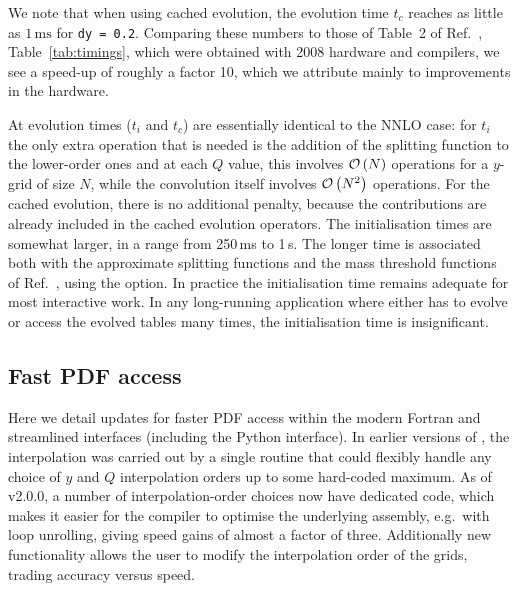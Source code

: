 We note that when using cached evolution, the evolution time $t_c$ reaches as
little as $1\,\mathrm{ms}$ for \texttt{dy = 0.2}.
%
Comparing these numbers to those of  
%
\ifreleasenote
Table~2 of Ref.~\cite{Salam:2008qg},
\else
Table~\ref{tab:timings},
\fi
%
which were obtained with 2008 hardware and compilers, we see a
speed-up of roughly a factor 10, which we attribute mainly to
improvements in the hardware.

At \ntlo  evolution times ($t_i$ and $t_c$) are essentially identical to the
NNLO case: for $t_i$ the only extra operation that is needed is the
addition of the \ntlo splitting function to the lower-order ones and
at each $Q$ value, this involves ${\cal O}\left(N\right)$ operations for a $y$-grid
of size $N$, while the convolution itself involves ${\cal O}\left(N^2\right)$
operations.
%
For the cached evolution, there is no additional penalty, because the
\ntlo contributions are already included in the cached evolution
operators.
%
The initialisation times are somewhat larger, in a range from 250\,ms
to 1\,s.
%
The longer time is associated both with the approximate \ntlo
splitting functions and the mass threshold functions of
Ref.~\cite{BlumleinCode}, using the  option.
%
In practice the initialisation time remains adequate for most
interactive work.
%
In any long-running application where \hoppet either has to evolve or
access the evolved tables many times, the initialisation time is
insignificant.
%



\subsection{Fast PDF access}
\label{sec:fastpdf}

Here we detail updates for faster PDF access within the
modern Fortran and streamlined interfaces (including the Python interface).
% 
%
In earlier versions of \hoppet, the interpolation was carried out by a
single routine that could flexibly handle any choice of $y$ and $Q$
interpolation orders up to some hard-coded maximum.
%
As of v2.0.0, a number of interpolation-order choices now have
dedicated code, which makes it easier for the compiler to optimise the
underlying assembly, e.g.\ with loop unrolling, giving speed gains of
almost a factor of three.
%
% 
Additionally new functionality allows the user to modify
the interpolation order of the \hoppet{} grids, trading accuracy
versus speed.


